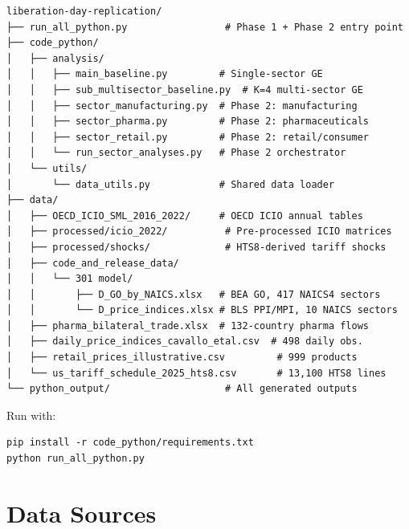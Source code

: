 \documentclass[12pt]{article}
\begin{document}
\begin{verbatim}
liberation-day-replication/
├── run_all_python.py                 # Phase 1 + Phase 2 entry point
├── code_python/
│   ├── analysis/
│   │   ├── main_baseline.py         # Single-sector GE
│   │   ├── sub_multisector_baseline.py  # K=4 multi-sector GE
│   │   ├── sector_manufacturing.py  # Phase 2: manufacturing
│   │   ├── sector_pharma.py         # Phase 2: pharmaceuticals
│   │   ├── sector_retail.py         # Phase 2: retail/consumer
│   │   └── run_sector_analyses.py   # Phase 2 orchestrator
│   └── utils/
│       └── data_utils.py            # Shared data loader
├── data/
│   ├── OECD_ICIO_SML_2016_2022/     # OECD ICIO annual tables
│   ├── processed/icio_2022/          # Pre-processed ICIO matrices
│   ├── processed/shocks/             # HTS8-derived tariff shocks
│   ├── code_and_release_data/
│   │   └── 301 model/
│   │       ├── D_GO_by_NAICS.xlsx   # BEA GO, 417 NAICS4 sectors
│   │       └── D_price_indices.xlsx # BLS PPI/MPI, 10 NAICS sectors
│   ├── pharma_bilateral_trade.xlsx  # 132-country pharma flows
│   ├── daily_price_indices_cavallo_etal.csv  # 498 daily obs.
│   ├── retail_prices_illustrative.csv         # 999 products
│   └── us_tariff_schedule_2025_hts8.csv       # 13,100 HTS8 lines
└── python_output/                    # All generated outputs
\end{verbatim}

\noindent Run with:
\begin{verbatim}
pip install -r code_python/requirements.txt
python run_all_python.py
\end{verbatim}

\section{Data Sources}
\end{document}
